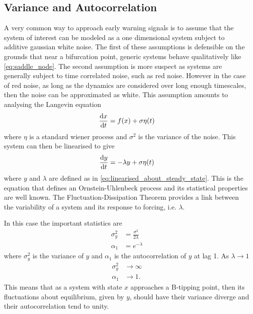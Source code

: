 \subsection{Variance and Autocorrelation}
A very common way to approach early warning signals is to assume that the system of interest can be modeled as a one dimensional system subject to additive gaussian white noise. The first
of these assumptions is defensible on the grounds that near a bifurcation point, generic systems behave qualitatively like \cref{eq:saddle_node}. The second assumption is more suspect
as systems are generally subject to time correlated noise, such as red noise. However in the case of red noise, as long as the dynamics are considered over long enough timescales, then the
noise can be approximated as white. This assumption amounts to analysing the Langevin equation \parencite{Langevin1908}
\begin{equation}
  \label{eq:stochastic_system}
  \dv{x}{t} = f(x) + \sigma \eta(t) 
\end{equation}
where $\eta$ is a standard wiener process and $\sigma^2$ is the variance of the noise. This system can then be linearised to give
\begin{equation}
  \label{eq:ou_process}
  \dv{y}{t} = -\lambda y + \sigma \eta(t)
\end{equation}
where $y$ and $\lambda$ are defined as in \cref{eq:linearised_about_steady_state}. This is the equation that defines an Ornstein-Uhlenbeck process \parencite{Uhlenbeck1930} and its statistical
properties are well known. The Fluctuation-Dissipation Theorem \parencite{Marconi2008,Kubo1966,Leith1975,Einstein1905}
provides a link between the variability of a system and its response to
forcing, i.e. $\lambda$.

In this case the important statistics are
\begin{align}
  \sigma^2_y &= \frac{\sigma^2}{2\lambda} \label{eq:y_var}\\
  \alpha_1   &= e^{-\lambda} \label{eq:y_ac}
\end{align}
where $\sigma^2_y$ is the variance of $y$ and $\alpha_1$ is the autocorrelation of $y$ at lag 1. As $\lambda \rightarrow 1$
\begin{align}
  \sigma_y^2 &\rightarrow \infty \\
  \alpha_1    &\rightarrow 1.
\end{align}
This means that as a system with state $x$ approaches a B-tipping point, then its fluctuations about equilibrium, given by $y$, should have their variance diverge and their autocorrelation
tend to unity.

